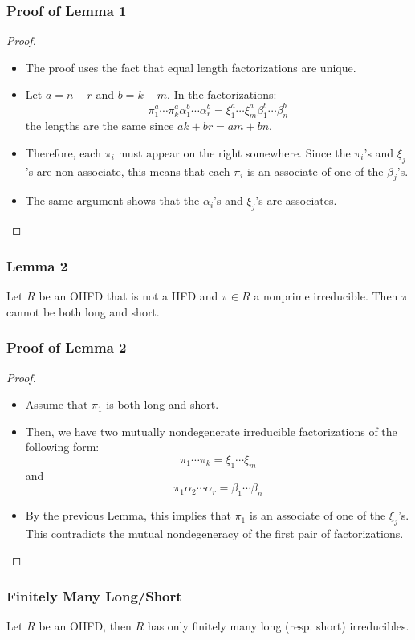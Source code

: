 \begin{frame}
  \frametitle{Proof of Lemma 1}
  \begin{proof}
    \begin{itemize}
      \item <1->The proof uses the fact that equal length factorizations are unique.
      \item <2->Let $a = n-r$ and $b = k - m$. In the factorizations:
	  $$\pi_1^a\cdots\pi_k^a\alpha_1^b\cdots\alpha_r^b=\xi_1^a\cdots\xi_m^a\beta_1^b\cdots\beta_n^b$$
	the lengths are the same since $ak+br=am+bn$. 
      \item <3->
	Therefore, each $\pi_i$ must appear on the right somewhere.
	Since the $\pi_i$'s and $\xi_j$'s are non-associate, this means that each $\pi_i$ is an associate of one of the $\beta_j$'s. 
      \item<4->The same argument shows that the $\alpha_i$'s and $\xi_j$'s are associates. 
    \end{itemize}
  \end{proof}
\end{frame}

\begin{frame}
  \frametitle{Lemma 2}
  \begin{lemma}
    Let $R$ be an OHFD that is not a HFD and $\pi \in R$ a nonprime irreducible. Then $\pi$ cannot be both long and short.
  \end{lemma}
\end{frame}

\begin{frame}
  \frametitle{Proof of Lemma 2}
  \begin{proof}
    \begin{itemize}
      \item <1->Assume that $\pi_1$ is both long and short.
      \item <2->Then, we have two mutually nondegenerate irreducible factorizations of the following form:
	  $$\pi_1\cdots\pi_k=\xi_1\cdots\xi_m$$
	and
	  $$\pi_1\alpha_2\cdots\alpha_r=\beta_1\cdots\beta_n$$
      \item <3->By the previous Lemma, this implies that $\pi_1$ is an associate of one of the $\xi_j$'s.
	This contradicts the mutual nondegeneracy of the first pair of factorizations.
    \end{itemize}
  \end{proof}
\end{frame}

\begin{frame}
  \frametitle{Finitely Many Long/Short}
  \begin{fact}
    Let $R$ be an OHFD, then $R$ has only finitely many long (resp. short) irreducibles.
  \end{fact}
\end{frame}

